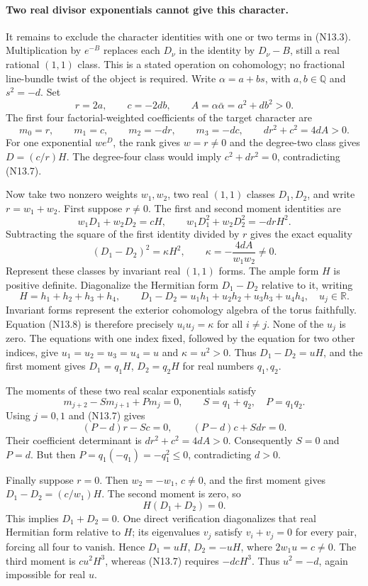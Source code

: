 \paragraph{Two real divisor exponentials cannot give this character.}
It remains to exclude the character identities with one or two
terms in (N13.3). Multiplication by $e^{-B}$ replaces each
$D_\nu$ in the identity by $D_\nu-B$, still a real rational
$(1,1)$ class. This is a stated operation on cohomology; no
fractional line-bundle twist of the object is required.
Write $\alpha=a+bs$, with $a,b\in\mathbb Q$ and $s^2=-d$.
Set
\[
 r=2a,\qquad c=-2db,\qquad
 A=\alpha\bar\alpha=a^2+db^2>0.
\]
The first four factorial-weighted coefficients of the target
character are
\[
 m_0=r,\qquad m_1=c,\qquad m_2=-dr,\qquad m_3=-dc,
 \qquad dr^2+c^2=4dA>0.                                 \tag{N13.7}
\]
For one exponential $w e^D$, the rank gives $w=r\ne0$ and
the degree-two class gives $D=(c/r)H$. The degree-four class
would imply $c^2+dr^2=0$, contradicting (N13.7).

Now take two nonzero weights $w_1,w_2$, two real $(1,1)$ classes
$D_1,D_2$, and write $r=w_1+w_2$. First suppose $r\ne0$.
The first and second moment identities are
\[
 w_1D_1+w_2D_2=cH,\qquad
 w_1D_1^2+w_2D_2^2=-drH^2.
\]
Subtracting the square of the first identity divided by $r$
gives the exact equality
\[
 (D_1-D_2)^2=\kappa H^2,
 \qquad\kappa=-\frac{4dA}{w_1w_2}\ne0.                   \tag{N13.8}
\]
Represent these classes by invariant real $(1,1)$ forms.
The ample form $H$ is positive definite. Diagonalize the
Hermitian form $D_1-D_2$ relative to it, writing
\[
 H=h_1+h_2+h_3+h_4,
 \qquad D_1-D_2=u_1h_1+u_2h_2+u_3h_3+u_4h_4,
 \quad u_j\in\mathbb R.
\]
Invariant forms represent the exterior cohomology algebra of
the torus faithfully. Equation (N13.8) is therefore precisely
$u_i u_j=\kappa$ for all $i\ne j$. None of the $u_j$ is zero.
The equations with one index fixed, followed by the equation
for two other indices, give
$u_1=u_2=u_3=u_4=u$ and $\kappa=u^2>0$.
Thus $D_1-D_2=uH$, and the first moment gives
$D_1=q_1H$, $D_2=q_2H$ for real numbers $q_1,q_2$.

The moments of these two real scalar exponentials satisfy
\[
 m_{j+2}-S m_{j+1}+P m_j=0,\qquad
 S=q_1+q_2,\quad P=q_1q_2.
\]
Using $j=0,1$ and (N13.7) gives
\[
 (P-d)r-Sc=0,\qquad (P-d)c+Sdr=0.
\]
Their coefficient determinant is $dr^2+c^2=4dA>0$.
Consequently $S=0$ and $P=d$. But then
$P=q_1(-q_1)=-q_1^2\le0$, contradicting $d>0$.

Finally suppose $r=0$. Then $w_2=-w_1$, $c\ne0$, and the
first moment gives $D_1-D_2=(c/w_1)H$. The second moment is
zero, so
\[
 H(D_1+D_2)=0.
\]
This implies $D_1+D_2=0$. One direct verification diagonalizes
that real Hermitian form relative to $H$; its eigenvalues
$v_j$ satisfy $v_i+v_j=0$ for every pair, forcing all four to
vanish. Hence $D_1=uH$, $D_2=-uH$, where $2w_1u=c\ne0$.
The third moment is $cu^2H^3$, whereas (N13.7) requires
$-dcH^3$. Thus $u^2=-d$, again impossible for real $u$.

